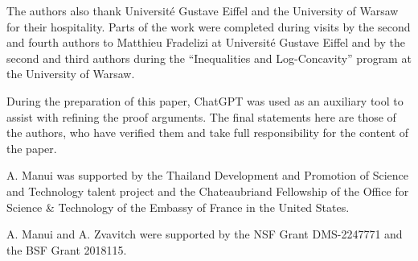\documentclass[11pt]{amsart}
\theoremstyle{plain}
\theoremstyle{definition}
\theoremstyle{remark}
\begin{document}
The authors also thank Universit\'e Gustave Eiffel and the University of Warsaw for their hospitality. Parts of the work were completed during visits by the second and fourth authors to Matthieu Fradelizi at Universit\'e Gustave Eiffel and by the second and third authors during the “Inequalities and Log-Concavity” program at the University of Warsaw.

During the preparation of this paper, ChatGPT was used as an auxiliary tool to assist with refining the proof arguments. The final statements here are those of the authors, who have verified them and take full responsibility for the content of the paper.

A. Manui was supported by the Thailand Development and Promotion of Science and Technology talent project and the Chateaubriand Fellowship of the Office for Science \& Technology of the Embassy of France in the United States.

A. Manui and A. Zvavitch were supported by the NSF Grant DMS-2247771 and the BSF Grant 2018115.
\end{document}
